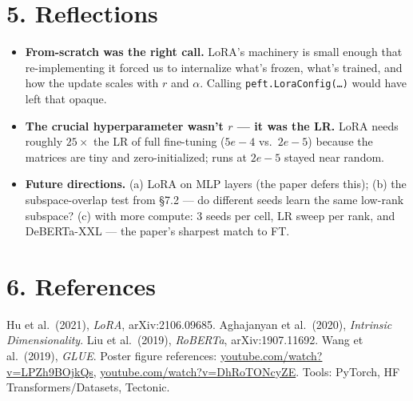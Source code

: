 \documentclass[11pt]{article}
\begin{document}
\section*{5. Reflections}

\begin{itemize}
\item \textbf{From-scratch was the right call.} LoRA's machinery is small
enough that re-implementing it forced us to internalize what's frozen,
what's trained, and how the update scales with $r$ and $\alpha$. Calling
\texttt{peft.LoraConfig(\dots)} would have left that opaque.
\item \textbf{The crucial hyperparameter wasn't $r$ --- it was the LR.}
LoRA needs roughly $25\times$ the LR of full fine-tuning ($5e{-}4$ vs.\ $2e{-}5$)
because the matrices are tiny and zero-initialized; runs at $2e{-}5$ stayed
near random.
\item \textbf{Future directions.} (a) LoRA on MLP layers (the paper defers
this); (b) the subspace-overlap test from \S7.2 --- do different seeds
learn the same low-rank subspace? (c) with more compute: 3 seeds per cell,
LR sweep per rank, and DeBERTa-XXL --- the paper's sharpest match to FT.
\end{itemize}

\section*{6. References}

\scriptsize
\raggedright
Hu et al.\ (2021), \emph{LoRA}, arXiv:2106.09685. \quad
Aghajanyan et al.\ (2020), \emph{Intrinsic Dimensionality}. \quad
Liu et al.\ (2019), \emph{RoBERTa}, arXiv:1907.11692. \quad
Wang et al.\ (2019), \emph{GLUE}. \quad
Poster figure references: \href{https://www.youtube.com/watch?v=LPZh9BOjkQs}{youtube.com/watch?v=LPZh9BOjkQs},
\href{https://www.youtube.com/watch?v=DhRoTONcyZE}{youtube.com/watch?v=DhRoTONcyZE}. \quad
Tools: PyTorch, HF Transformers/Datasets, Tectonic.
\end{document}
